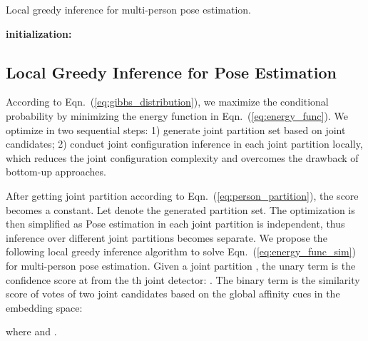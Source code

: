 \documentclass[10pt,twocolumn,letterpaper]{article}
\begin{document}
\begin{algorithm}[t!]\small \caption{Local greedy inference for multi-person pose estimation. }
	\label{alg:greedy_infer_alg}
	 
		 \textbf{initialization:}   \\
\label{alg:local_greedy_search}
\end{algorithm}

\subsection{Local Greedy Inference for Pose Estimation}

According to Eqn.~(\ref{eq:gibbs_distribution}), we maximize the conditional probability  by minimizing the energy function  in Eqn.~(\ref{eq:energy_func}). We  optimize  in two sequential steps: 1) generate joint partition set based on joint candidates;
2) conduct  joint configuration inference in each joint partition locally, which reduces the joint configuration complexity and overcomes the drawback of bottom-up approaches.

After getting  joint partition according to Eqn.~(\ref{eq:person_partition}), the score  becomes a constant. Let   denote the generated partition set. The optimization  is then simplified as 
Pose estimation in each joint partition is independent, thus inference over different joint partitions becomes separate. We propose the following local greedy inference algorithm to solve
Eqn.~(\ref{eq:energy_func_sim})
for multi-person pose estimation. Given a joint partition ,   the unary term  is the confidence score   at   from the th joint detector: .
The binary term  is  the similarity score of votes of two joint candidates based on the global affinity cues in the  embedding space:

where  and .
\end{document}
